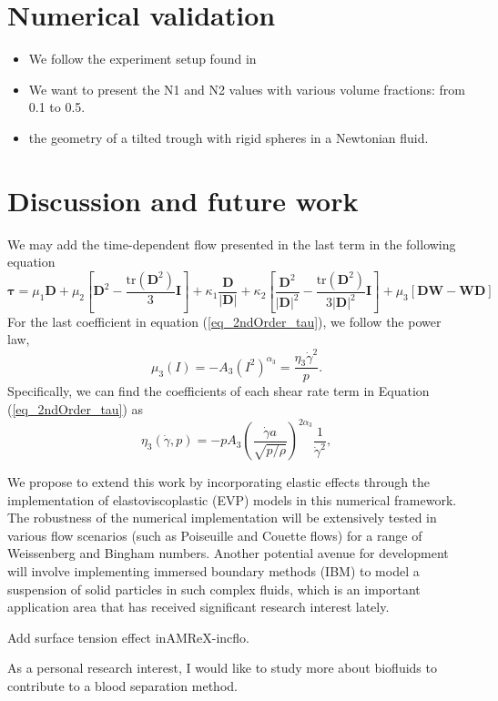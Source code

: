 \section{Numerical validation}
\begin{itemize}
  \item We follow the experiment setup found in \cite{couturier_suspensions_2011}
  \item We want to present the N1 and N2 values with various volume fractions: from 0.1 to 0.5.
  \item the geometry of a tilted trough with rigid spheres in a Newtonian fluid. 
\end{itemize}

\section{Discussion and future work}
We may add the time-dependent flow presented in the last term in the following equation
\begin{equation}
  \bm{\tau} =  \mu_1 {\bm D} 
    + \mu_2  \left[ {\bm D}^2  - \frac{\text{tr}\left({\bm D}^2\right)}{3}{\bm I} \right]
   + \kappa_1 \frac{{\bm D}}{|{\bm D}|} 
    + \kappa_2  \left[ \frac{{\bm D}^2}{|{\bm D}|^2}  
    - \frac{\text{tr}\left({\bm D}^2\right)}{3|{\bm D}|^2}{\bm I} \right]
    + \mu_3  \left[ {\bm D}{\bm W} - {\bm W}{\bm D} \right]
  \end{equation}
  For the last coefficient in equation (\ref{eq_2ndOrder_tau}), we follow the power law, 
\begin{equation}
    \mu_3(I) = -A_3 \left( I^2 \right)^{\alpha_3} = \frac{\eta_3 \dot{\gamma}^2}{p}.
\label{eq_muI3}
\end{equation}
Specifically, we can find the coefficients of each shear rate term in Equation (\ref{eq_2ndOrder_tau}) as
\begin{equation}
     \eta_3 (\dot{\gamma}, p) = 
    -p A_3 
        \left( \frac{\dot{\gamma} a }{\sqrt{p/\rho}}  \right)^{2\alpha_3} 
        \frac{1}{\dot{\gamma}^2},
\label{eq_gr_eta_3}
\end{equation}
\par
We propose to extend this work by incorporating elastic effects through the implementation of elastoviscoplastic (EVP) models in this numerical framework. The robustness of the numerical implementation will be extensively tested in various flow scenarios (such as Poiseuille and Couette flows) for a range of Weissenberg and Bingham numbers.  Another potential avenue for development will involve implementing immersed boundary methods (IBM) to model a suspension of solid particles in such complex fluids, which is an important application area that has received significant research interest lately. 
\par
Add surface tension effect inAMReX-incflo. 
\par 
As a personal research interest, I would like to study more about biofluids to contribute to a blood separation method. 